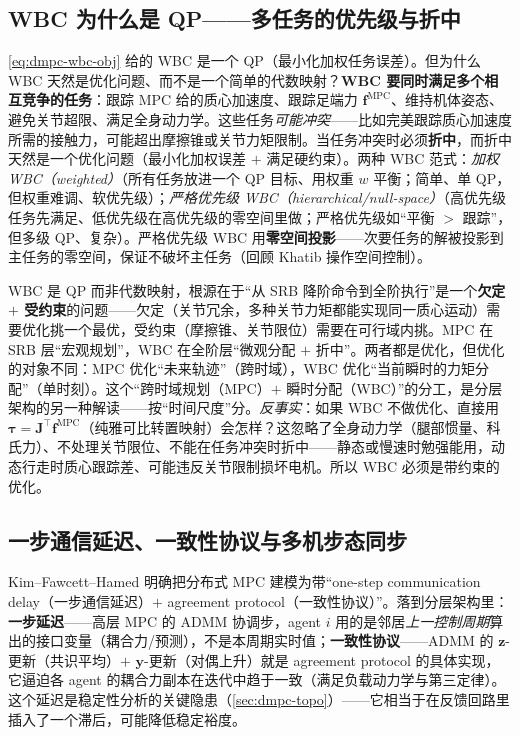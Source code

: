 \subsection{WBC 为什么是 QP——多任务的优先级与折中}
\label{sec:dmpc-wbc-qp}

\cref{eq:dmpc-wbc-obj} 给的 WBC 是一个 QP（最小化加权任务误差）。但为什么 WBC 天然是优化问题、而不是一个简单的代数映射？\textbf{WBC 要同时满足多个相互竞争的任务}：跟踪 MPC 给的质心加速度、跟踪足端力 $\mathbf{f}^{\text{MPC}}$、维持机体姿态、避免关节超限、满足全身动力学。这些任务\emph{可能冲突}——比如完美跟踪质心加速度所需的接触力，可能超出摩擦锥或关节力矩限制。当任务冲突时必须\textbf{折中}，而折中天然是一个优化问题（最小化加权误差 $+$ 满足硬约束）。两种 WBC 范式：\emph{加权 WBC（weighted）}（所有任务放进一个 QP 目标、用权重 $w$ 平衡；简单、单 QP，但权重难调、软优先级）；\emph{严格优先级 WBC（hierarchical/null-space）}（高优先级任务先满足、低优先级在高优先级的零空间里做；严格优先级如“平衡 $>$ 跟踪”，但多级 QP、复杂）。严格优先级 WBC 用\textbf{零空间投影}——次要任务的解被投影到主任务的零空间，保证不破坏主任务（回顾 Khatib 操作空间控制\cite{khatib1987operational}）。

\begin{insight}\label{ins:dmpc-wbc-underdet}
WBC 是 QP 而非代数映射，根源在于“从 SRB 降阶命令到全阶执行”是一个\textbf{欠定 $+$ 受约束}的问题——欠定（关节冗余，多种关节力矩都能实现同一质心运动）需要优化挑一个最优，受约束（摩擦锥、关节限位）需要在可行域内挑。MPC 在 SRB 层“宏观规划”，WBC 在全阶层“微观分配 $+$ 折中”。两者都是优化，但优化的对象不同：MPC 优化“未来轨迹”（跨时域），WBC 优化“当前瞬时的力矩分配”（单时刻）。这个“跨时域规划（MPC）$+$ 瞬时分配（WBC）”的分工，是分层架构的另一种解读——按“时间尺度”分。\emph{反事实}：如果 WBC 不做优化、直接用 $\boldsymbol{\tau}=\mathbf{J}^\top\mathbf{f}^{\text{MPC}}$（纯雅可比转置映射）会怎样？这忽略了全身动力学（腿部惯量、科氏力）、不处理关节限位、不能在任务冲突时折中——静态或慢速时勉强能用，动态行走时质心跟踪差、可能违反关节限制损坏电机。所以 WBC 必须是带约束的优化。
\end{insight}

\subsection{一步通信延迟、一致性协议与多机步态同步}
\label{sec:dmpc-delay-gait}

Kim--Fawcett--Hamed\cite{kim2023layered} 明确把分布式 MPC 建模为带“one-step communication delay（一步通信延迟）$+$ agreement protocol（一致性协议）”。落到分层架构里：\textbf{一步延迟}——高层 MPC 的 ADMM 协调步，agent $i$ 用的是邻居\emph{上一控制周期}算出的接口变量（耦合力/预测），不是本周期实时值；\textbf{一致性协议}——ADMM 的 $\mathbf{z}$-更新（共识平均）$+$ $\mathbf{y}$-更新（对偶上升）就是 agreement protocol 的具体实现，它逼迫各 agent 的耦合力副本在迭代中趋于一致（满足负载动力学与第三定律）。这个延迟是稳定性分析的关键隐患（\cref{sec:dmpc-topo}）——它相当于在反馈回路里插入了一个滞后，可能降低稳定裕度。

